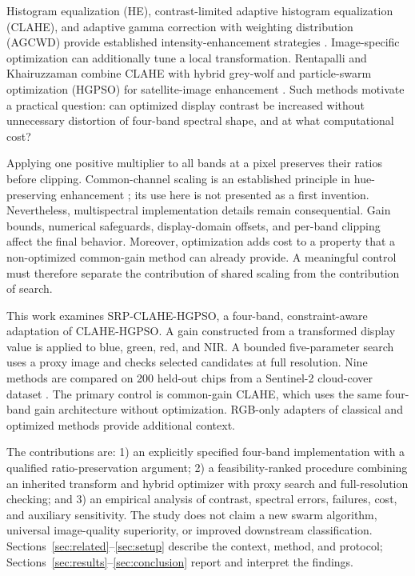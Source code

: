 \documentclass[conference]{IEEEtran}
\newcommand{\srp}{SRP-CLAHE-HGPSO}
\begin{document}
Histogram equalization (HE), contrast-limited adaptive histogram equalization (CLAHE), and adaptive gamma correction with weighting distribution (AGCWD) provide established intensity-enhancement strategies \cite{pizer1987,huang2013}. Image-specific optimization can additionally tune a local transformation. Rentapalli and Khairuzzaman combine CLAHE with hybrid grey-wolf and particle-swarm optimization (HGPSO) for satellite-image enhancement \cite{rentapalli2026}. Such methods motivate a practical question: can optimized display contrast be increased without unnecessary distortion of four-band spectral shape, and at what computational cost?

Applying one positive multiplier to all bands at a pixel preserves their ratios before clipping. Common-channel scaling is an established principle in hue-preserving enhancement \cite{naik2003}; its use here is not presented as a first invention. Nevertheless, multispectral implementation details remain consequential. Gain bounds, numerical safeguards, display-domain offsets, and per-band clipping affect the final behavior. Moreover, optimization adds cost to a property that a non-optimized common-gain method can already provide. A meaningful control must therefore separate the contribution of shared scaling from the contribution of search.

This work examines \srp, a four-band, constraint-aware adaptation of CLAHE-HGPSO. A gain constructed from a transformed display value is applied to blue, green, red, and NIR. A bounded five-parameter search uses a proxy image and checks selected candidates at full resolution. Nine methods are compared on 200 held-out chips from a Sentinel-2 cloud-cover dataset \cite{radiant2022}. The primary control is common-gain CLAHE, which uses the same four-band gain architecture without optimization. RGB-only adapters of classical and optimized methods provide additional context.

The contributions are: 1) an explicitly specified four-band implementation with a qualified ratio-preservation argument; 2) a feasibility-ranked procedure combining an inherited transform and hybrid optimizer with proxy search and full-resolution checking; and 3) an empirical analysis of contrast, spectral errors, failures, cost, and auxiliary sensitivity. The study does not claim a new swarm algorithm, universal image-quality superiority, or improved downstream classification. Sections~\ref{sec:related}--\ref{sec:setup} describe the context, method, and protocol; Sections~\ref{sec:results}--\ref{sec:conclusion} report and interpret the findings.
\end{document}
